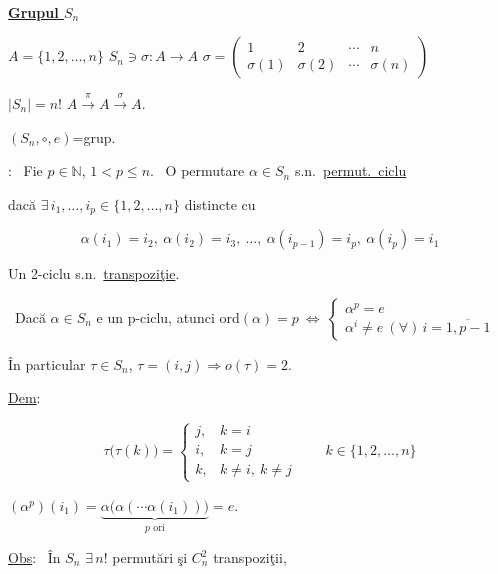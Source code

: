 \documentclass[12pt]{article}
\begin{document}
\begin{center}
\\[2pt]
\end{center}
\begin{flushright}
\end{flushright}

\bigskip
\noindent\underline{\textbf{Grupul $S_n$}}

\bigskip
\noindent $A=\{1,2,\ldots,n\}$ \quad $S_n \ni \sigma: A\to A$ \quad $\sigma = \begin{pmatrix}1&2&\cdots&n\\ \sigma(1)&\sigma(2)&\cdots&\sigma(n)\end{pmatrix}$

\noindent $|S_n|=n!$ \qquad $A\xrightarrow{\ \pi\ }A\xrightarrow{\ \sigma\ }A.$

\bigskip
\noindent $(S_n,\circ,e)$=grup.

\bigskip
\noindent{}: \ Fie $p\in\mathbb{N}$, $1<p\leq n$. \ O permutare $\alpha\in S_n$ s.n.\ \underline{permut.\ ciclu}

\noindent dacă $\exists\,i_1,\ldots,i_p\in\{1,2,\ldots,n\}$ distincte cu

\[
\alpha(i_1)=i_2, \ \alpha(i_2)=i_3, \ \ldots, \ \alpha(i_{p-1})=i_p, \ \alpha(i_p)=i_1
\]

\bigskip
\noindent Un 2-ciclu s.n.\ \underline{transpoziţie}.

\bigskip
\noindent{} \ Dacă $\alpha\in S_n$ e un p-ciclu, atunci ord$(\alpha)=p \ \Leftrightarrow \ \begin{cases}\alpha^p=e\\ \alpha^i\neq e \ (\forall)\,i=\overline{1,p-1}\end{cases}$

\bigskip
\noindent În particular $\tau\in S_n$, $\tau=(i,j) \Rightarrow o(\tau)=2$.

\bigskip
\noindent\underline{Dem}:

\[
\tau\big(\tau(k)\big)=
\begin{cases}
j, & k=i\\
i, & k=j\\
k, & k\neq i,\ k\neq j
\end{cases}
\qquad k\in\{1,2,\ldots,n\}
\]

\bigskip
\noindent $(\alpha^p)(i_1) = \underbrace{\alpha\big(\alpha(\cdots\alpha(i_1))\big)}_{p \text{ ori}} = e.$

\bigskip
\noindent\underline{Obs}: \ În $S_n$ $\exists\,n!$ permutări şi $C_n^2$ transpoziţii,
\end{document}

